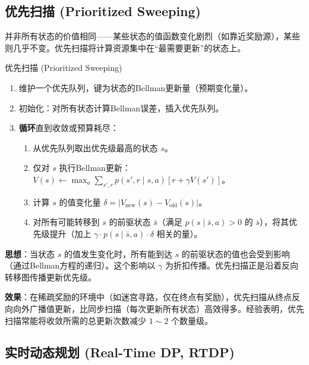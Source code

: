 \subsection{优先扫描 (Prioritized Sweeping)}

并非所有状态的价值相同——某些状态的值函数变化剧烈（如靠近奖励源），某些则几乎不变。优先扫描将计算资源集中在``最需要更新''的状态上。

\begin{myalgorithm}{优先扫描 (Prioritized Sweeping)}
\begin{enumerate}
    \item 维护一个优先队列，键为状态的Bellman更新量（预期变化量）。
    \item 初始化：对所有状态计算Bellman误差，插入优先队列。
    \item \textbf{循环}直到收敛或预算耗尽：
    \begin{enumerate}
        \item 从优先队列取出优先级最高的状态 $s$。
        \item 仅对 $s$ 执行Bellman更新：$V(s) \leftarrow \max_a \sum_{s', r} p(s', r \mid s, a) [r + \gamma V(s')]$。
        \item 计算 $s$ 的值变化量 $\delta = |V_{\text{new}}(s) - V_{\text{old}}(s)|$。
        \item 对所有可能转移到 $s$ 的前驱状态 $\bar{s}$（满足 $p(s \mid \bar{s}, a) > 0$ 的 $\bar{s}$），将其优先级提升（加上 $\gamma \cdot p(s \mid \bar{s}, a) \cdot \delta$ 相关的量）。
    \end{enumerate}
\end{enumerate}
\end{myalgorithm}

\textbf{思想}：当状态 $s$ 的值发生变化时，所有能到达 $s$ 的前驱状态的值也会受到影响（通过Bellman方程的递归）。这个影响以 $\gamma$ 为折扣传播。优先扫描正是沿着反向转移图传播更新优先级。

\textbf{效果}：在稀疏奖励的环境中（如迷宫寻路，仅在终点有奖励），优先扫描从终点反向向外广播值更新，比同步扫描（每次更新所有状态）高效得多。经验表明，优先扫描常能将收敛所需的总更新次数减少 $1\sim2$ 个数量级。

\subsection{实时动态规划 (Real-Time DP, RTDP)}

